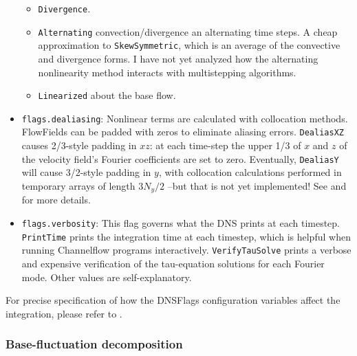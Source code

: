 \documentclass{article}[12pt]
\begin{document}
\begin{itemize}
\begin{itemize}
  \item {\tt Divergence}.
  \item {\tt Alternating} convection/divergence an alternating time steps.
  A cheap approximation to {\tt SkewSymmetric}, which is an average of
  the convective and divergence forms. I have not yet analyzed how the
  alternating nonlinearity method interacts with multistepping algorithms.
  \item {\tt Linearized} about the base flow.
\end{itemize}
\item {\tt flags.dealiasing}: Nonlinear terms are calculated with
collocation methods. FlowFields can be padded with zeros to
eliminate aliasing errors. {\tt DealiasXZ} causes 2/3-style padding
in $xz$: at each time-step the upper 1/3 of $x$ and $z$ of the velocity
field's Fourier coefficients are set to zero. Eventually, {\tt DealiasY}
will cause 3/2-style padding in $y$, with collocation calculations performed
in temporary arrays of length $3 N_y/2$ --but that is not yet implemented!
See \cite{Canuto88} and   for more details.
\item {\tt flags.verbosity}: This flag governs what the DNS prints
at each timestep. {\tt PrintTime} prints the integration time at each
timestep, which is helpful when running Channelflow programs interactively.
{\tt VerifyTauSolve} prints a verbose and expensive verification of the
tau-equation solutions for each Fourier mode. Other values are
self-explanatory.
\end{itemize}

For precise specification of how the DNSFlags configuration variables
affect the integration, please refer to .

\subsubsection{Base-fluctuation decomposition}
\end{document}
